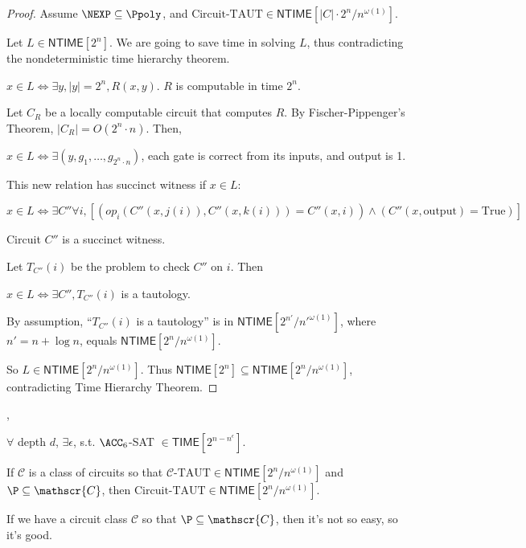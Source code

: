 \documentclass[letterpaper, 12pt]{article}
\newcommand{\Time}[1]{\mathsf{TIME}[#1]}
\newcommand{\NTime}[1]{\mathsf{NTIME}[#1]}
\newcommand{\ctaut}{\textrm{Circuit-TAUT}}
\newcommand{\taut}{\textrm{-TAUT}}
\begin{document}
\begin{proof}
	Assume $\NEXP \subseteq \Ppoly$, and $\ctaut\in \NTime{|C|\cdot 2^n / n^{\omega(1)}}$.
	
	Let $L \in \NTime{2^n}$. We are going to save time in solving $L$, thus contradicting the nondeterministic time hierarchy theorem.
	
	$x \in L \Leftrightarrow \exists y, |y|=2^n, R(x,y)$. $R$ is computable in time $2^n$.
	
	Let $C_R$ be a locally computable circuit that computes $R$. By Fischer-Pippenger's Theorem, $|C_R| = O(2^n \cdot n)$. Then,
	
	$x \in L \Leftrightarrow \exists (y, g_1, \dots, g_{2^n \cdot n})$, each gate is correct from its inputs, and output is 1.
	
	This new relation has succinct witness if $x \in L$:
	
	$x \in L \Leftrightarrow \exists C'' \forall i, \left[ (op_i(C''(x, j(i)), C''(x,k(i))) = C''(x,i)) \wedge (C''(x, \mathrm{output}) = \mathrm{True})\right]$
	
	Circuit $C''$ is a succinct witness.
	
	Let $T_{C''}(i)$ be the problem to check $C''$ on $i$. Then
	
	$x \in L \Leftrightarrow \exists C'', T_{C''}(i)$ is a tautology.
	
	By assumption, ``$T_{C''}(i)$ is a tautology'' is in $\NTime{2^{n'}/ {n'}^{\omega(1)}}$, where $n' = n + \log n$, equals $\NTime{2^{n}/ {n}^{\omega(1)}}$.
	
	So $L \in \NTime{2^{n}/ {n}^{\omega(1)}}$. Thus $\NTime{2^n} \subseteq \NTime{2^{n}/ {n}^{\omega(1)}}$, contradicting Time Hierarchy Theorem.
\end{proof}

\sep

\begin{theorem}[Williams]
	$\forall$ depth $d$, $\exists \epsilon$, s.t. $\ACC_6$-SAT $\in \Time{2^{n - n^\epsilon}}$.
\end{theorem}

\begin{lemma}\label{lemma1}
	If $\mathscr{C}$ is a class of circuits so that $\mathscr{C}\taut \in \NTime{2^n /n^{\omega(1)}}$ and $\P \subseteq \mathscr{C}$, then $\ctaut \in \NTime{2^n/n^{\omega(1)}}$.
\end{lemma}

If we have a circuit class $\mathscr{C}$ so that $\P \subseteq \mathscr{C}$, then it's not so easy, so it's good.
\end{document}
